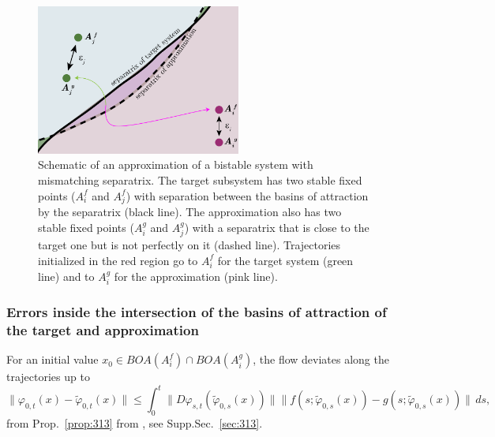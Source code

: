 \documentclass{article}
\theoremstyle{definition}
\theoremstyle{remark}
\newcounter{ct}
\begin{document}
\setlength\belowcaptionskip{-1ex}
\begin{figure}
  \centering
  \includegraphics[width=0.6\textwidth]{separatrices}
  \caption{
	Schematic of an approximation of a bistable system with mismatching separatrix. %
	The target subsystem has two stable fixed points ($A_i^f$ and $A_j^f$) with separation between the basins of attraction by the separatrix (black line).
	The approximation also has two stable fixed points ($A_i^g$ and $A_j^g$) with a separatrix that is close to the target one but is not perfectly on it (dashed line).
	Trajectories initialized in the red region go to $A_i^f$ for the target system (green line) and to $A_i^g$ for the approximation (pink line). %
  }\label{fig:separatrices}
\end{figure}

\subsubsection{Errors inside the intersection of the basins of attraction of the target and approximation}\label{sec:inboa_approx}
For an initial value $x_0\in BOA(A_i^f) \cap BOA(A_i^g)$, the flow deviates along the trajectories up to 
\[
\|\varphi_{0,t}(x) - \tilde{\varphi}_{0,t}(x)\| \leq \int_0^t \|D\varphi_{s,t}(\tilde{\varphi}_{0,s}(x))\| \|f(s; \tilde{\varphi}_{0,s}(x)) - g(s; \tilde{\varphi}_{0,s}(x))\| \, ds,
\]
from Prop.~\ref{prop:313} from \citep{vanhandel2007filtering}, see Supp.Sec.~\ref{sec:313}.
%
\end{document}
